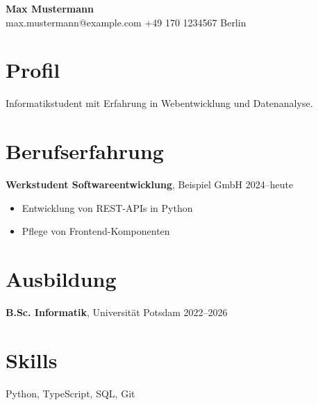 \documentclass[11pt,a4paper]{article}
\begin{document}
{\LARGE\textbf{Max Mustermann}}\\[2pt]
max.mustermann@example.com \quad +49 170 1234567 \quad Berlin

\section*{Profil}
Informatikstudent mit Erfahrung in Webentwicklung und Datenanalyse.

\section*{Berufserfahrung}
\textbf{Werkstudent Softwareentwicklung}, Beispiel GmbH \hfill 2024--heute
\begin{itemize}
  \item Entwicklung von REST-APIs in Python
  \item Pflege von Frontend-Komponenten
\end{itemize}

\section*{Ausbildung}
\textbf{B.Sc. Informatik}, Universität Potsdam \hfill 2022--2026

\section*{Skills}
Python, TypeScript, SQL, Git
\end{document}

